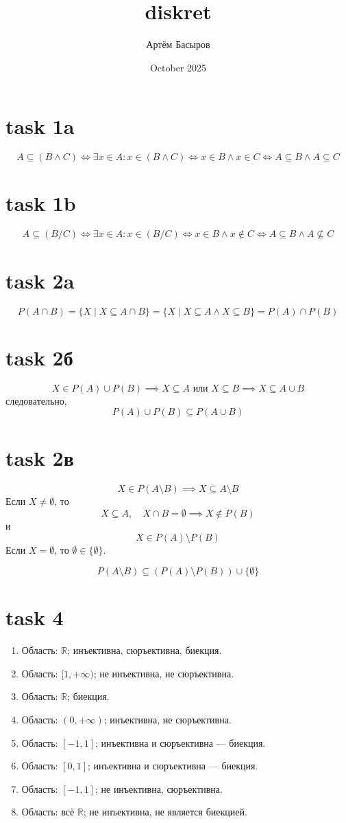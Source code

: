 \documentclass{article}
\title{diskret}
\author{Артём Басыров}
\date{October 2025}
\begin{document}
\maketitle

\section{task 1a}
$$
A \subseteq (B \land C) \iff \exists x \in A : x \in (B \land C) \iff x \in B \land x \in C \iff A \subseteq B \land A \subseteq C
$$
\section{task 1b}
$$
A \subseteq (B / C) \iff \exists x \in A : x \in (B / C) \iff x \in B \land x \notin C \iff A \subseteq B \land A \not\subseteq C
$$
\section{task 2a}
$$
P(A \cap B) = \{ X \mid X \subseteq A \cap B \} = \{ X \mid X \subseteq A \land X \subseteq B \} = P(A) \cap P(B)
$$

\section{task 2б}
$$
X \in P(A) \cup P(B) \implies X \subseteq A \text{ или } X \subseteq B \implies X \subseteq A \cup B
$$
следовательно,
$$
P(A) \cup P(B) \subseteq P(A \cup B)
$$

\section{task 2в}
$$
X \in P(A \setminus B) \implies X \subseteq A \setminus B
$$
Если $X \neq \emptyset$, то
$$
X \subseteq A,\quad X \cap B = \emptyset \implies X \notin P(B)
$$
и
$$
X \in P(A) \setminus P(B)
$$
Если $X = \emptyset$, то $\emptyset \in \{\emptyset\}$.

$$
P(A \setminus B) \subseteq (P(A) \setminus P(B)) \cup \{\emptyset\}
$$

\section{task 4}
\begin{enumerate}[label=\arabic*)]
  \item Область: $\mathbb{R}$; инъективна, сюръективна, биекция.
  \item Область: $[1, +\infty)$; не инъективна, не сюръективна.
  \item Область: $\mathbb{R}$; биекция.
  \item Область: $(0, +\infty)$; инъективна, не сюръективна.
  \item Область: $[-1, 1]$; инъективна и сюръективна — биекция.
  \item Область: $[0, 1]$; инъективна и сюръективна — биекция.
  \item Область: $[-1, 1]$; не инъективна, сюръективна.
  \item Область: всё $\mathbb{R}$; не инъективна, не является биекцией.
\end{enumerate}
\end{document}
